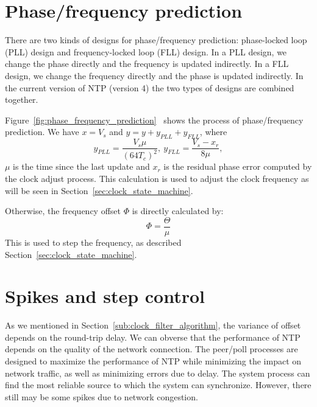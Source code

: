 

\section{Phase/frequency prediction}%
\label{sec:phase_frequency_prediction}
There are two kinds of designs for phase/frequency prediction: phase-locked
loop (PLL) design and frequency-locked loop (FLL) design. In a PLL design, we
change the phase directly and the frequency is updated indirectly. In a FLL
design, we change the frequency directly and the phase is updated indirectly.
In the current version of NTP (version 4) the two types of designs are combined
together. 

Figure~\ref{fig:phase_frequency_prediction}~\cite{redbook} shows the process of
phase/frequency prediction. We have $x = V_s$ and $y = y + y_{PLL} + y_{FLL}$,
where
\begin{equation}
    y_{PLL} = \frac{V_s\mu}{\left(64T_c\right)^2},\
    y_{FLL} = \frac{V_s-x_r}{8\mu},
    \label{eq:y_pll}
\end{equation}
$\mu$ is the time since the last update and $x_r$ is the residual phase
error computed by the clock adjust process. This calculation is used to adjust
the clock frequency as will be seen in Section~\ref{sec:clock_state_machine}.

Otherwise, the frequency offset $\Phi$ is directly calculated by:
\begin{equation}
    \Phi = \frac{\Theta}{\mu}
    \label{eq:frequency_offset}
\end{equation}
This is used to step the frequency, as described
Section~\ref{sec:clock_state_machine}. 




\section{Spikes and step control}%
\label{sec:spikes_and_step_control}
As we mentioned in Section~\ref{sub:clock_filter_algorithm}, the variance of
offset depends on the round-trip delay. We can obverse that the performance of
NTP depends on the quality of the network connection. The peer/poll processes
are designed to maximize the performance of NTP while minimizing the impact on
network traffic, as well as minimizing errors due to delay. The system process
can find the most reliable source to which the system can synchronize. However,
there still may be some spikes due to network congestion. 

